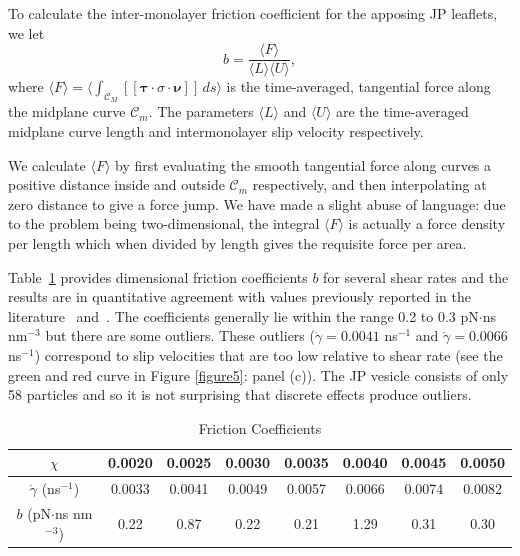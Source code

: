 \documentclass[lineno]{jfm}
\newcommand{\nnu}{\boldsymbol{\nu}}
\newcommand{\ttau}{\boldsymbol{\tau}}
\newcommand{\jump}[1]{[\![ #1 ]\!]}
\begin{document}
To calculate the inter-monolayer friction coefficient for the apposing JP leaflets, we let  
\begin{equation}
b = \frac{\langle F\rangle}{\langle L \rangle \langle U\rangle },
\end{equation}
%
where $\langle F\rangle = \langle \int_{\mathcal{C}_M} \jump{\ttau \cdot \sigma \cdot \nnu} \,ds\rangle$ 
is the time-averaged, tangential force along the midplane curve $\mathcal{C}_m$. 
The parameters $\langle L\rangle$ and $\langle U\rangle$ are the time-averaged midplane curve length and
intermonolayer slip velocity respectively.  

We calculate $\langle F\rangle$ by first evaluating the smooth tangential force along curves a positive distance inside and 
outside $\mathcal{C}_m$ respectively, and then interpolating at zero distance to give a force jump. 
We have made a slight abuse of language: due to the problem being two-dimensional,
the integral $\langle F\rangle$ is actually a force density per length which when divided by length gives the requisite force per area. 

Table~\ref{table1} provides dimensional friction coefficients $b$ for several shear rates
and the results are in quantitative agreement with 
values previously reported in the literature~\cite{sch-vla-mik2010} and~\cite{denOtter2007}.  
The coefficients generally lie within the range 0.2 to 0.3 pN$\cdot$ns nm$^{-3}$ but there are some 
outliers.  These outliers ($\dot\gamma = 0.0041$ ns$^{-1}$ and 
$\dot\gamma = 0.0066$ ns$^{-1}$) correspond to slip velocities that are too low relative to shear rate (see the green and red curve in Figure \ref{figure5}: panel (c)).
The JP vesicle consists of only  58 particles and so it is not surprising that discrete effects produce outliers. 


\begin{table}
\caption{Friction Coefficients}
\centering    
\begin{tabular}{c c c c c c c c }
 $\chi$ & 0.0020   &  0.0025 &  0.0030 &  0.0035 &  0.0040 & 0.0045 & 0.0050  \\
\hline                    
$\dot\gamma$ (ns$^{-1}$)        & 0.0033 & 0.0041 & 0.0049 & 0.0057 & 0.0066 & 0.0074 & 0.0082\\
$b$ (pN$\cdot$ns nm$^{-3}$)    & 0.22 & 0.87  & 0.22 &0.21 & 1.29 & 0.31 & 0.30\\ 
\hline    
\end{tabular} 
\label{table1}
\end{table}
\end{document}
